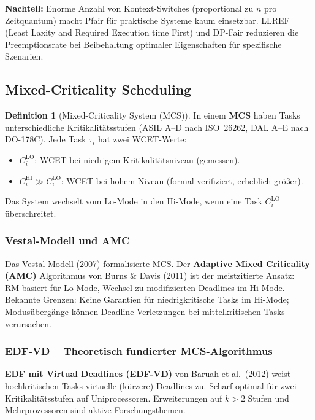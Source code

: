 ﻿\documentclass[a4paper,12pt]{report}
\theoremstyle{definition}
\newtheorem{definition}{Definition}[chapter]
\begin{document}
\textbf{Nachteil:} Enorme Anzahl von Kontext-Switches (proportional zu $n$
pro Zeitquantum) macht Pfair für praktische Systeme kaum einsetzbar.
LLREF (Least Laxity and Required Execution time First) und DP-Fair
reduzieren die Preemptionsrate bei Beibehaltung optimaler Eigenschaften
für spezifische Szenarien.

\subsection{Mixed-Criticality Scheduling}

\begin{definition}[Mixed-Criticality System (MCS)]
	In einem \textbf{MCS} haben Tasks unterschiedliche Kritikalitätsstufen
	(ASIL A--D nach ISO~26262, DAL A--E nach DO-178C). Jede Task $\tau_i$
	hat zwei WCET-Werte:
	\begin{itemize}
		\item $C_i^{\mathrm{LO}}$: WCET bei niedrigem Kritikalitätsniveau (gemessen).
		\item $C_i^{\mathrm{HI}} \gg C_i^{\mathrm{LO}}$: WCET bei hohem Niveau
		      (formal verifiziert, erheblich größer).
	\end{itemize}
	Das System wechselt vom Lo-Mode in den Hi-Mode, wenn eine Task $C_i^{\mathrm{LO}}$
	überschreitet.
\end{definition}

\subsubsection{Vestal-Modell und AMC}

Das Vestal-Modell (2007) formalisierte MCS. Der \textbf{Adaptive Mixed Criticality
(AMC)} Algorithmus von Burns \& Davis (2011) ist der meistzitierte Ansatz:
RM-basiert für Lo-Mode, Wechsel zu modifizierten Deadlines im Hi-Mode.
Bekannte Grenzen: Keine Garantien für niedrigkritische Tasks im Hi-Mode;
Modusübergänge können Deadline-Verletzungen bei mittelkritischen Tasks
verursachen.

\subsubsection{EDF-VD -- Theoretisch fundierter MCS-Algorithmus}

\textbf{EDF mit Virtual Deadlines (EDF-VD)} von Baruah et al.\ (2012) weist
hochkritischen Tasks virtuelle (kürzere) Deadlines zu. Scharf optimal für
zwei Kritikalitätsstufen auf Uniprocessoren. Erweiterungen auf $k > 2$ Stufen
und Mehrprozessoren sind aktive Forschungsthemen.
\end{document}
